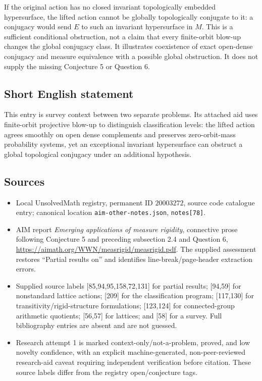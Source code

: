 \documentclass[11pt]{article}
\begin{document}
If the original action has no closed invariant topologically embedded hypersurface, the lifted action cannot be globally topologically conjugate to it: a conjugacy would send $E$ to such an invariant hypersurface in $M$. This is a sufficient conditional obstruction, not a claim that every finite-orbit blow-up changes the global conjugacy class. It illustrates coexistence of exact open-dense conjugacy and measure equivalence with a possible global obstruction. It does not supply the missing Conjecture 5 or Question 6.
\subsection{Short English statement}
This entry is survey context between two separate problems. Its attached aid uses finite-orbit projective blow-up to distinguish classification levels: the lifted action agrees smoothly on open dense complements and preserves zero-orbit-mass probability systems, yet an exceptional invariant hypersurface can obstruct a global topological conjugacy under an additional hypothesis.
\subsection{Sources}
\begin{itemize}
\item Local UnsolvedMath registry, permanent ID $20003272$, source code catalogue entry; canonical location \texttt{aim-other-notes.json}, \texttt{notes[78]}.
\item AIM report \emph{Emerging applications of measure rigidity}, connective prose following Conjecture 5 and preceding subsection 2.4 and Question 6, \url{https://aimath.org/WWN/measrigid/measrigid.pdf}. The supplied assessment restores ``Partial results on'' and identifies line-break/page-header extraction errors.
\item Supplied source labels [85,94,95,158,72,131] for partial results; [94,59] for nonstandard lattice actions; [209] for the classification program; [117,130] for transitivity/rigid-structure formulations; [123,124] for connected-group arithmetic quotients; [56,57] for lattices; and [58] for a survey. Full bibliography entries are absent and are not guessed.
\item Research attempt 1 is marked context-only/not-a-problem, proved, and low novelty confidence, with an explicit machine-generated, non-peer-reviewed research-aid caveat requiring independent verification before citation. These source labels differ from the registry open/conjecture tags.
\end{itemize}
\end{document}
